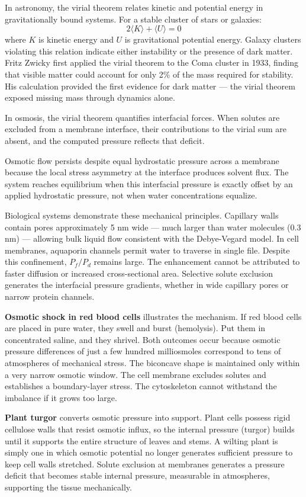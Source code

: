In astronomy, the virial theorem relates kinetic and potential energy in gravitationally bound systems. For a stable cluster of stars or galaxies:
\[
2\langle K \rangle + \langle U \rangle = 0
\]
where $K$ is kinetic energy and $U$ is gravitational potential energy. Galaxy clusters violating this relation indicate either instability or the presence of dark matter. Fritz Zwicky first applied the virial theorem to the Coma cluster in 1933, finding that visible matter could account for only 2\% of the mass required for stability. His calculation provided the first evidence for dark matter — the virial theorem exposed missing mass through dynamics alone.

In osmosis, the virial theorem quantifies interfacial forces. When solutes are excluded from a membrane interface, their contributions to the virial sum are absent, and the computed pressure reflects that deficit.

Osmotic flow persists despite equal hydrostatic pressure across a membrane because the local stress asymmetry at the interface produces solvent flux. The system reaches equilibrium when this interfacial pressure is exactly offset by an applied hydrostatic pressure, not when water concentrations equalize.

Biological systems demonstrate these mechanical principles. Capillary walls contain pores approximately 5 nm wide — much larger than water molecules (0.3 nm) — allowing bulk liquid flow consistent with the Debye-Vegard model. In cell membranes, aquaporin channels permit water to traverse in single file. Despite this confinement, $P_f / P_d$ remains large. The enhancement cannot be attributed to faster diffusion or increased cross-sectional area. Selective solute exclusion generates the interfacial pressure gradients, whether in wide capillary pores or narrow protein channels.

\textbf{Osmotic shock in red blood cells} illustrates the mechanism. If red blood cells are placed in pure water, they swell and burst (hemolysis). Put them in concentrated saline, and they shrivel. Both outcomes occur because osmotic pressure differences of just a few hundred milliosmoles correspond to tens of atmospheres of mechanical stress. The biconcave shape is maintained only within a very narrow osmotic window. The cell membrane excludes solutes and establishes a boundary-layer stress. The cytoskeleton cannot withstand the imbalance if it grows too large.

\textbf{Plant turgor} converts osmotic pressure into support. Plant cells possess rigid cellulose walls that resist osmotic influx, so the internal pressure (turgor) builds until it supports the entire structure of leaves and stems. A wilting plant is simply one in which osmotic potential no longer generates sufficient pressure to keep cell walls stretched. Solute exclusion at membranes generates a pressure deficit that becomes stable internal pressure, measurable in atmospheres, supporting the tissue mechanically.

